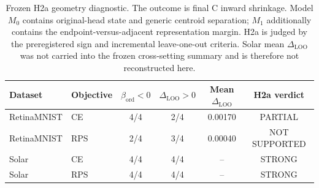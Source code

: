 \begin{table}[t]
\centering
\caption{Frozen H2a geometry diagnostic. The outcome is final C inward shrinkage. Model $M_0$ contains original-head state and generic centroid separation; $M_1$ additionally contains the endpoint-versus-adjacent representation margin. H2a is judged by the preregistered sign and incremental leave-one-out criteria. Solar mean $\Delta_{\mathrm{LOO}}$ was not carried into the frozen cross-setting summary and is therefore not reconstructed here.}
\label{tab:confirmatory-h2a}
\small
\begin{tabular}{llcccc}
\toprule
Dataset & Objective & $\hat\beta_{\mathrm{ord}}<0$ & $\Delta_{\mathrm{LOO}}>0$ & Mean $\Delta_{\mathrm{LOO}}$ & H2a verdict \\
\midrule
RetinaMNIST & CE  & 4/4 & 2/4 & 0.00170 & PARTIAL \\
RetinaMNIST & RPS & 2/4 & 3/4 & 0.00040 & NOT SUPPORTED \\
Solar & CE       & 4/4 & 4/4 & -- & STRONG \\
Solar & RPS      & 4/4 & 4/4 & -- & STRONG \\
\bottomrule
\end{tabular}
\end{table}
